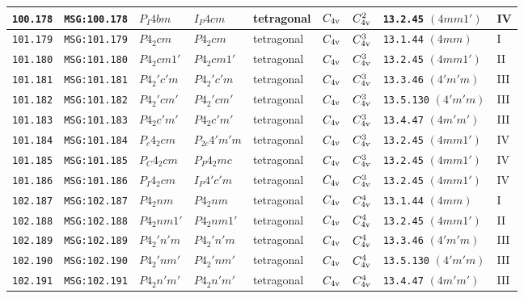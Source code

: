 \documentclass[fleqn,10pt]{jsarticle}
\begin{document}
\begin{center}
\begin{longtable}{lllllllll}
\texttt{100.178} & \texttt{MSG:100.178} & $P_{I}4bm$ & $I_{P}4cm$ & tetragonal & $C_{\rm 4v}$ & $C_{\rm 4v}^{2}$ & \texttt{13.2.45} $(4mm1')$ & IV \\ \hline
\texttt{101.179} & \texttt{MSG:101.179} & $P4_{2}cm$ & $P4_{2}cm$ & tetragonal & $C_{\rm 4v}$ & $C_{\rm 4v}^{3}$ & \texttt{13.1.44} $(4mm)$ & I \\
\texttt{101.180} & \texttt{MSG:101.180} & $P4_{2}cm1'$ & $P4_{2}cm1'$ & tetragonal & $C_{\rm 4v}$ & $C_{\rm 4v}^{3}$ & \texttt{13.2.45} $(4mm1')$ & II \\
\texttt{101.181} & \texttt{MSG:101.181} & $P4_{2}'c'm$ & $P4_{2}'c'm$ & tetragonal & $C_{\rm 4v}$ & $C_{\rm 4v}^{3}$ & \texttt{13.3.46} $(4'm'm)$ & III \\
\texttt{101.182} & \texttt{MSG:101.182} & $P4_{2}'cm'$ & $P4_{2}'cm'$ & tetragonal & $C_{\rm 4v}$ & $C_{\rm 4v}^{3}$ & \texttt{13.5.130} $(4'm'm)$ & III \\
\texttt{101.183} & \texttt{MSG:101.183} & $P4_{2}c'm'$ & $P4_{2}c'm'$ & tetragonal & $C_{\rm 4v}$ & $C_{\rm 4v}^{3}$ & \texttt{13.4.47} $(4m'm')$ & III \\
\texttt{101.184} & \texttt{MSG:101.184} & $P_{c}4_{2}cm$ & $P_{2c}4'm'm$ & tetragonal & $C_{\rm 4v}$ & $C_{\rm 4v}^{3}$ & \texttt{13.2.45} $(4mm1')$ & IV \\
\texttt{101.185} & \texttt{MSG:101.185} & $P_{C}4_{2}cm$ & $P_{P}4_{2}mc$ & tetragonal & $C_{\rm 4v}$ & $C_{\rm 4v}^{3}$ & \texttt{13.2.45} $(4mm1')$ & IV \\
\texttt{101.186} & \texttt{MSG:101.186} & $P_{I}4_{2}cm$ & $I_{P}4'c'm$ & tetragonal & $C_{\rm 4v}$ & $C_{\rm 4v}^{3}$ & \texttt{13.2.45} $(4mm1')$ & IV \\ \hline
\texttt{102.187} & \texttt{MSG:102.187} & $P4_{2}nm$ & $P4_{2}nm$ & tetragonal & $C_{\rm 4v}$ & $C_{\rm 4v}^{4}$ & \texttt{13.1.44} $(4mm)$ & I \\
\texttt{102.188} & \texttt{MSG:102.188} & $P4_{2}nm1'$ & $P4_{2}nm1'$ & tetragonal & $C_{\rm 4v}$ & $C_{\rm 4v}^{4}$ & \texttt{13.2.45} $(4mm1')$ & II \\
\texttt{102.189} & \texttt{MSG:102.189} & $P4_{2}'n'm$ & $P4_{2}'n'm$ & tetragonal & $C_{\rm 4v}$ & $C_{\rm 4v}^{4}$ & \texttt{13.3.46} $(4'm'm)$ & III \\
\texttt{102.190} & \texttt{MSG:102.190} & $P4_{2}'nm'$ & $P4_{2}'nm'$ & tetragonal & $C_{\rm 4v}$ & $C_{\rm 4v}^{4}$ & \texttt{13.5.130} $(4'm'm)$ & III \\
\texttt{102.191} & \texttt{MSG:102.191} & $P4_{2}n'm'$ & $P4_{2}n'm'$ & tetragonal & $C_{\rm 4v}$ & $C_{\rm 4v}^{4}$ & \texttt{13.4.47} $(4m'm')$ & III \\

\end{longtable}
\end{center}
\end{document}
